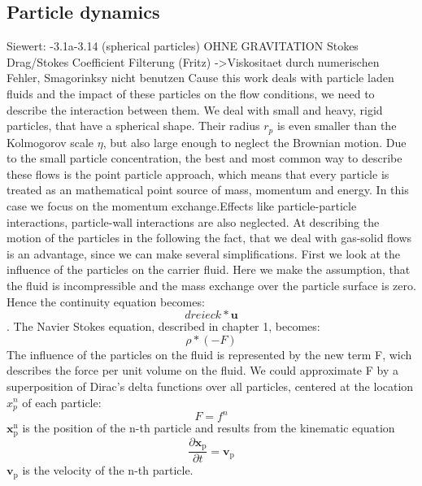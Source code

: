 \documentclass[a4paper,10pt]{article}
\renewcommand*\vec[1]{\boldsymbol{#1}}
\numberwithin{equation}{section} %
\begin{document}
\subsection{Particle dynamics} %
Siewert:
-3.1a-3.14 (spherical particles) OHNE GRAVITATION
Stokes Drag/Stokes Coefficient
Filterung (Fritz) ->Viskositaet durch numerischen Fehler, Smagorinksy nicht benutzen
\newline
\newline
Cause this work deals with particle laden fluids and the impact of these particles on the flow conditions, we need to describe the interaction between them. 
We deal with small and heavy, rigid particles, that have a spherical shape. Their radius $ r_p $ is even smaller than the Kolmogorov scale $ \eta $, but also large enough to neglect the Brownian motion.
Due to the small particle concentration, the best and most common way to describe these flows is the point particle approach, which means that every particle is treated as an mathematical point source of mass, momentum and energy. In this case we focus on the momentum exchange.Effects like particle-particle interactions, particle-wall interactions are also neglected.  
At describing the motion of the particles in the following the fact, that we deal with gas-solid flows is an advantage, since we can make several simplifications.
First we look at the influence of the particles on the carrier fluid. Here we make the assumption, that the fluid is incompressible and the mass exchange over the particle surface is zero.
Hence the continuity equation becomes:
\begin{equation}
dreieck * \vec{u}
\end{equation}.
The Navier Stokes equation, described in chapter 1, becomes:
\begin{equation}
\rho*(-F)
\end{equation}
The influence of the particles on the fluid is represented by the new term F, wich describes the force per unit volume on the fluid.
We could approximate F by a superposition of Dirac's delta functions over all particles, centered at the location $x_p^n$ of each particle:
\begin{equation}
F = f^n
\end{equation}
$\vec{x_\mathrm{p}^\mathrm{n}} $ is the position of the n-th particle and results from the kinematic equation 
\begin{equation}
 \frac{\partial{\vec{x_\mathrm{p}}}}{\partial{t}} = \vec{v_\mathrm{p}}
\end{equation}
$\vec{v_\mathrm{p}}$ is the velocity of the n-th particle.
\end{document}
